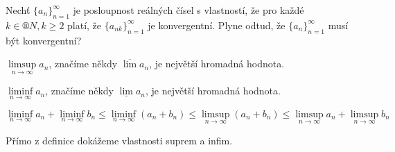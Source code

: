 \documentclass[12pt]{article}					%
\begin{document}
    \begin{priklad}
        Nechť $\{a_n\}_{n = 1}^∞$ je posloupnost reálných čísel s vlastností, že pro každé $k \in ®N, k≥2$ platí, že $\{a_{nk}\}_{n = 1}^∞$ je konvergentní. Plyne odtud, že $\{a_n\}_{n = 1}^∞$ musí být konvergentní?
    \end{priklad}

    \begin{poznamka}[Připomeňme]
        $\limsup\limits_{n \rightarrow ∞} a_n$, značíme někdy $\overline{\lim} a_n$, je největší hromadná hodnota.

        $\liminf\limits_{n \rightarrow ∞} a_n$, značíme někdy $\underline{\lim} a_n$, je největší hromadná hodnota.
    \end{poznamka}

    \begin{tvrzeni}
        $$ \liminf\limits_{n \rightarrow ∞} a_n + \liminf\limits_{n \rightarrow ∞}b_n ≤ \liminf\limits_{n \rightarrow ∞} (a_n + b_n) ≤ \limsup\limits_{n \rightarrow ∞} (a_n + b_n) ≤ \limsup\limits_{n \rightarrow ∞} a_n + \limsup\limits_{n \rightarrow ∞} b_n $$
        \begin{dukazin}
            Přímo z definice dokážeme vlastnosti suprem a infim.
        \end{dukazin}
    \end{tvrzeni}

    
\end{document}
